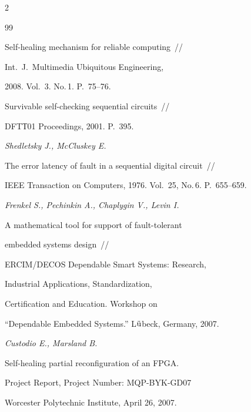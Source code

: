 \begin{multicols}{2}
{{\begin{thebibliography}{99}



Self-healing mechanism for reliable computing~//

Int.\ J.\ Multimedia Ubiquitous Engineering,

2008. Vol.~3. No.\,1. P.~75--76.






Survivable self-checking sequential circuits~//

DFTТ01 Proceedings, 2001. P.~395.





{\it Shedletsky J., McCluskey E.}

The error latency of fault in a sequential digital circuit~//

IEEE Transaction on Computers, 1976. Vol.~25, No.\,6. P.~655--659.





{\it Frenkel S., Pechinkin A., Chaplygin V., Levin I.}

A mathematical tool for support of fault-tolerant

embedded systems design~//

ERCIM/DECOS Dependable Smart Systems: Research,

Industrial Applications, Standardization,

Certification and Education. Workshop on

``Dependable Embedded Systems.'' L$\ddot{\text u}$beck, Germany, 2007.





{\it Custodio E., Marsland B.}

Self-healing partial reconfiguration of an FPGA.

Project Report, Project Number: MQP-BYK-GD07

Worcester Polytechnic Institute, April 26, 2007.






\end{thebibliography}}}
\end{multicols}
